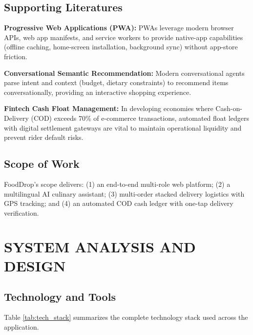 \documentclass[12pt,a4paper]{report}
\begin{document}
\section{Supporting Literatures}
\textbf{Progressive Web Applications (PWA):} PWAs leverage modern browser APIs, web app manifests, and service workers to provide native-app capabilities (offline caching, home-screen installation, background sync) without app-store friction.

\textbf{Conversational Semantic Recommendation:} Modern conversational agents parse intent and context (budget, dietary constraints) to recommend items conversationally, providing an interactive shopping experience.

\textbf{Fintech Cash Float Management:} In developing economies where Cash-on-Delivery (COD) exceeds 70\% of e-commerce transactions, automated float ledgers with digital settlement gateways are vital to maintain operational liquidity and prevent rider default risks.

\section{Scope of Work}
FoodDrop's scope delivers: (1) an end-to-end multi-role web platform; (2) a multilingual AI culinary assistant; (3) multi-order stacked delivery logistics with GPS tracking; and (4) an automated COD cash ledger with one-tap delivery verification.

\newpage

\chapter{SYSTEM ANALYSIS AND DESIGN}

\section{Technology and Tools}
Table \ref{tab:tech_stack} summarizes the complete technology stack used across the application.
\end{document}
